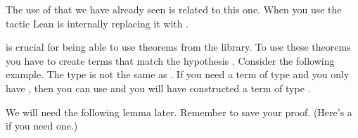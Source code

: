 \documentclass[letterpaper,10pt,english]{sphinxmanual}
\begin{document}
\sphinxAtStartPar
The use of  that we have already seen is related to this one.
When you use the tactic 
Lean is internally replacing it with .

\sphinxAtStartPar
{} is crucial for being able to use theorems from the library.
To use these theorems you have to create terms that match the hypothesis .
Consider the following example.
The type  is not the same as .
If you need a term of type  and you only have , then you can use
 and you will have constructed a term  of type .

\sphinxAtStartPar
We will need the following lemma later. Remember to save your proof.
(Here’s a  if you need one.)
\end{document}
